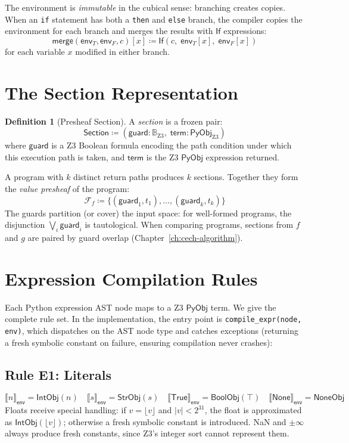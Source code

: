 \documentclass[11pt,a4paper]{report}
\theoremstyle{definition}
\newtheorem{definition}{Definition}[chapter]
\theoremstyle{plain}
\newcommand{\den}[1]{\llbracket #1 \rrbracket}
\newcommand{\Bool}{\mathbb{B}}
\newcommand{\PyObj}{\mathsf{PyObj}}
\newcommand{\presheaf}{\mathcal{F}}
\begin{document}
The environment is \emph{immutable} in the cubical sense: branching
creates copies.  When an \texttt{if} statement has both a \texttt{then}
and \texttt{else} branch, the compiler copies the environment for each
branch and merges the results with $\mathsf{If}$ expressions:
\[
  \mathsf{merge}(\mathsf{env}_T, \mathsf{env}_F, c)[x] \coloneqq
    \mathsf{If}(c,\; \mathsf{env}_T[x],\; \mathsf{env}_F[x])
\]
for each variable $x$ modified in either branch.

\section{The Section Representation}

\begin{definition}[Presheaf Section]
A \emph{section} is a frozen pair:
\[
  \mathsf{Section} \coloneqq (\mathsf{guard} : \Bool_{\mathrm{Z3}},\;
    \mathsf{term} : \PyObj_{\mathrm{Z3}})
\]
where $\mathsf{guard}$ is a Z3 Boolean formula encoding the path
condition under which this execution path is taken, and
$\mathsf{term}$ is the Z3 $\PyObj$ expression returned.
\end{definition}

A program with $k$ distinct return paths produces $k$ sections.
Together they form the \emph{value presheaf} of the program:
\[
  \presheaf_f \coloneqq \{(\mathsf{guard}_1, t_1), \ldots,
    (\mathsf{guard}_k, t_k)\}
\]
The guards partition (or cover) the input space: for well-formed
programs, the disjunction
$\bigvee_i \mathsf{guard}_i$ is tautological.  When comparing
programs, sections from $f$ and $g$ are paired by guard overlap
(Chapter~\ref{ch:cech-algorithm}).

\section{Expression Compilation Rules}

Each Python expression AST node maps to a Z3 $\PyObj$ term.  We give
the complete rule set.  In the implementation, the entry point is
\texttt{compile\_expr(node, env)}, which dispatches on the AST
node type and catches exceptions (returning a fresh symbolic
constant on failure, ensuring compilation never crashes):

\subsection{Rule E1: Literals}
\[
  \den{n}_\mathsf{env} = \mathsf{IntObj}(n) \quad
  \den{s}_\mathsf{env} = \mathsf{StrObj}(s) \quad
  \den{\mathsf{True}}_\mathsf{env} = \mathsf{BoolObj}(\top) \quad
  \den{\mathsf{None}}_\mathsf{env} = \mathsf{NoneObj}
\]
Floats receive special handling: if $v = \lfloor v \rfloor$ and
$|v| < 2^{31}$, the float is approximated as
$\mathsf{IntObj}(\lfloor v \rfloor)$;
otherwise a fresh symbolic constant is introduced.
NaN and $\pm\infty$ always produce fresh constants, since Z3's
integer sort cannot represent them.
\end{document}

